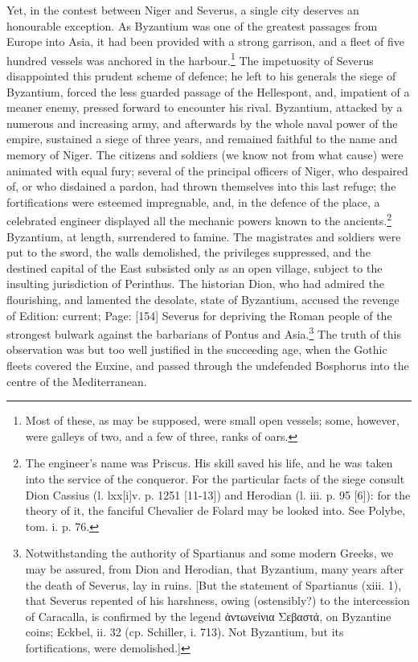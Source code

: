 Yet, in the contest between Niger and Severus, a single city deserves an honourable exception. As Byzantium was one of the greatest passages from Europe into Asia, it had been provided with a strong garrison, and a fleet of five hundred vessels was anchored in the harbour.\footnote{Most of these, as may be supposed, were small open vessels; some, however, were galleys of two, and a few of three, ranks of oars.} The impetuosity of Severus disappointed this prudent scheme of defence; he left to his generals the siege of Byzantium, forced the less guarded passage of the Hellespont, and, impatient of a meaner enemy, pressed forward to encounter his rival. Byzantium, attacked by a numerous and increasing army, and afterwards by the whole naval power of the empire, sustained a siege of three years, and remained faithful to the name and memory of Niger. The citizens and soldiers (we know not from what cause) were animated with equal fury; several of the principal officers of Niger, who despaired of, or who disdained a pardon, had thrown themselves into this last refuge; the fortifications were esteemed impregnable, and, in the defence of the place, a celebrated engineer displayed all the mechanic powers known to the ancients.\footnote{The engineer\texthebrew{}’s name was Priscus. His skill saved his life, and he was taken into the service of the conqueror. For the particular facts of the siege consult Dion Cassius (l. lxx[i]v. p. 1251 [11-13]) and Herodian (l. iii. p. 95 [6]): for the theory of it, the fanciful Chevalier de Folard may be looked into. See Polybe, tom. i. p. 76.} Byzantium, at length, surrendered to famine. The magistrates and soldiers were put to the sword, the walls demolished, the privileges suppressed, and the destined capital of the East subsisted only as an open village, subject to the insulting jurisdiction of Perinthus. The historian Dion, who had admired the flourishing, and lamented the desolate, state of Byzantium, accused the revenge of Edition: current; Page: [154] Severus for depriving the Roman people of the strongest bulwark against the barbarians of Pontus and Asia.\footnote{Notwithstanding the authority of Spartianus and some modern Greeks, we may be assured, from Dion and Herodian, that Byzantium, many years after the death of Severus, lay in ruins. [But the statement of Spartianus (xiii. 1), that Severus repented of his harshness, owing (ostensibly?) to the intercession of Caracalla, is confirmed by the legend \textgreek{\texthebrew{ἀ}ντωνείνια Σεβαστά}, on Byzantine coins; Eckbel, ii. 32 (cp. Schiller, i. 713). Not Byzantium, but its fortifications, were demolished.]} The truth of this observation was but too well justified in the succeeding age, when the Gothic fleets covered the Euxine, and passed through the undefended Bosphorus into the centre of the Mediterranean.

